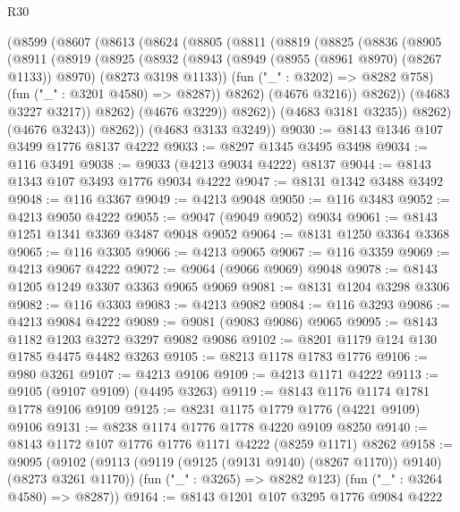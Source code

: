 \begin{lexlean}{R30}
\begin{coremodule}
        (@8599
          (@8607
            (@8613
              (@8624
                (@8805
                  (@8811
                    (@8819
                      (@8825
                        (@8836
                          (@8905
                            (@8911
                              (@8919
                                (@8925
                                  (@8932
                                    (@8943
                                      (@8949 (@8955 (@8961 @8970) (@8267 @1133)) @8970)
                                      (@8273 @3198 @1133))
                                    (fun ("_" : @3202) => @8282 @758)
                                    (fun ("_" : @3201 @4580) => @8287))
                                  @8262)
                                (@4676 @3216))
                              @8262))
                          (@4683 @3227 @3217))
                        @8262)
                      (@4676 @3229))
                    @8262))
                (@4683 @3181 @3235))
              @8262)
            (@4676 @3243))
          @8262))
      (@4683 @3133 @3249))
@9030 := @8143 @1346 @107 @3499 @1776 @8137 @4222
@9033 := @8297 @1345 @3495 @3498
@9034 := @116 @3491
@9038 := @9033 (@4213 @9034 @4222) @8137
@9044 := @8143 @1343 @107 @3493 @1776 @9034 @4222
@9047 := @8131 @1342 @3488 @3492
@9048 := @116 @3367
@9049 := @4213 @9048
@9050 := @116 @3483
@9052 := @4213 @9050 @4222
@9055 := @9047 (@9049 @9052) @9034
@9061 := @8143 @1251 @1341 @3369 @3487 @9048 @9052
@9064 := @8131 @1250 @3364 @3368
@9065 := @116 @3305
@9066 := @4213 @9065
@9067 := @116 @3359
@9069 := @4213 @9067 @4222
@9072 := @9064 (@9066 @9069) @9048
@9078 := @8143 @1205 @1249 @3307 @3363 @9065 @9069
@9081 := @8131 @1204 @3298 @3306
@9082 := @116 @3303
@9083 := @4213 @9082
@9084 := @116 @3293
@9086 := @4213 @9084 @4222
@9089 := @9081 (@9083 @9086) @9065
@9095 := @8143 @1182 @1203 @3272 @3297 @9082 @9086
@9102 := @8201 @1179 @124 @130 @1785 @4475 @4482 @3263
@9105 := @8213 @1178 @1783 @1776
@9106 := @980 @3261
@9107 := @4213 @9106
@9109 := @4213 @1171 @4222
@9113 := @9105 (@9107 @9109) (@4495 @3263)
@9119 := @8143 @1176 @1174 @1781 @1778 @9106 @9109
@9125 := @8231 @1175 @1779 @1776 (@4221 @9109) @9106
@9131 := @8238 @1174 @1776 @1778 @4220 @9109 @8250
@9140 := @8143 @1172 @107 @1776 @1776 @1171 @4222 (@8259 @1171) @8262
@9158 := @9095
    (@9102
      (@9113 (@9119 (@9125 (@9131 @9140) (@8267 @1170)) @9140) (@8273 @3261 @1170))
      (fun ("_" : @3265) => @8282 @123)
      (fun ("_" : @3264 @4580) => @8287))
@9164 := @8143 @1201 @107 @3295 @1776 @9084 @4222

\end{coremodule}
\end{lexlean}
